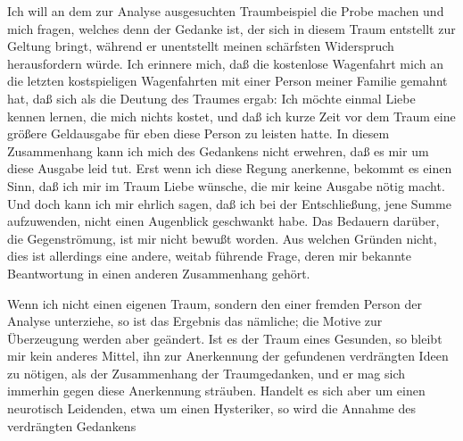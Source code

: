 \documentclass{article}
\begin{document}
            
        \pstart
        Ich will an dem zur Analyse ausgesuchten Traumbeispiel die Probe machen und mich
               fragen, welches denn der Gedanke ist, der sich in diesem Traum entstellt zur
               Geltung bringt, während er unentstellt meinen schärfsten Widerspruch
               herausfordern würde. Ich erinnere mich, daß die kostenlose Wagenfahrt mich an
               die letzten kostspieligen Wagenfahrten mit einer Person meiner Familie
               gemahnt hat, daß sich als die Deutung des Traumes ergab: Ich möchte einmal Liebe
               kennen lernen, die mich nichts kostet, und daß ich kurze Zeit vor dem Traum eine
               größere Geldausgabe für eben diese Person zu leisten hatte. In diesem
               Zusammenhang kann ich mich des Gedankens nicht erwehren,
               daß es mir um diese Ausgabe leid tut. Erst wenn
               ich diese Regung anerkenne, bekommt es einen Sinn, daß ich mir im Traum
               Liebe wünsche, die mir keine Ausgabe nötig macht. Und doch kann ich mir ehrlich
               sagen, daß ich bei der Entschließung, jene Summe aufzuwenden, nicht
               einen Augenblick geschwankt habe. Das Bedauern darüber, die Gegenströmung,
               ist mir nicht bewußt worden. Aus welchen Gründen nicht, dies ist allerdings
               eine andere, weitab führende Frage, deren mir bekannte Beantwortung in einen
               anderen Zusammenhang gehört.
        \pend
    
            
        \pstart
        Wenn ich nicht einen eigenen Traum, sondern den einer fremden Person der Analyse
               unterziehe, so ist das Ergebnis das nämliche; die Motive zur Überzeugung werden
               aber geändert. Ist es der Traum eines Gesunden, so bleibt mir kein anderes
               Mittel, ihn zur Anerkennung der gefundenen verdrängten Ideen zu nötigen, als der
               Zusammenhang der Traumgedanken, und er mag sich immerhin gegen diese Anerkennung
               sträuben. Handelt es sich aber um einen neurotisch Leidenden, etwa um einen
               Hysteriker, so wird die Annahme des verdrängten Gedankens
        \pend
    
         
            
            
            
\end{document}
